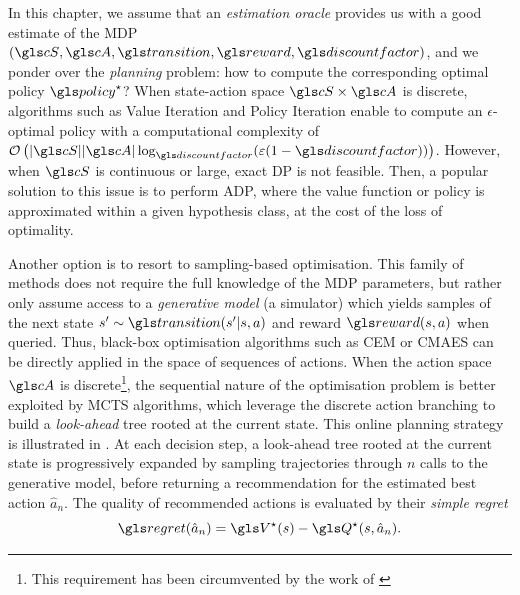 In this chapter, we assume that an \emph{estimation oracle} provides us with a good estimate of the \gls{MDP} $(\cS, \cA, \Ps, \reward, \discount)$, and we ponder over the \emph{planning} problem: how to compute the corresponding optimal policy $\policy^\star$?
When state-action space $\cS\times\cA$ is discrete,  algorithms such as Value Iteration \citep{Bellman1957} and Policy Iteration \citep{Howard1960} enable to compute an $\epsilon$-optimal policy with a computational complexity of $\cO\left(|\cS||\cA|\log_\discount(\epsilon(1-\discount))\right)$. However, when $\cS$ is continuous or large, exact \gls{DP} is not feasible. Then, a popular solution to this issue is to perform \gls{ADP}, where the value function or policy is approximated within a given hypothesis class, at the cost of the loss of optimality.

Another option is to resort to sampling-based optimisation. This family of methods does not require the full knowledge of the \gls{MDP} parameters, but rather only assume access to a \emph{generative model} (\eg a simulator) which yields samples of the next state $s' \sim \Ps\parentheses{s'|s,a}$ and reward $\R(s, a)$ when queried. Thus, black-box optimisation algorithms such as \gls{CEM} or \gls{CMAES} can be directly applied in the space of sequences of actions. When the action space $\cA$ is discrete\footnote{This requirement has been circumvented by the work of \citet{Coulom2007,Chaslot2008,Wang2009,Busoniu2013,Busoniu2018}}, the sequential nature of the optimisation problem is better exploited by \gls{MCTS} algorithms, which leverage the discrete action branching to build a \emph{look-ahead} tree rooted at the current state. This online planning strategy is illustrated in . At each decision step, a look-ahead tree rooted at the current state is progressively expanded by sampling trajectories through $n$ calls to the generative model, before returning a recommendation for the estimated best action $\hat{a}_n$. The quality of recommended actions is evaluated by their \emph{simple regret}
\begin{equation*}
\regret(\hat{a}_n) = \V^\star(s) - \Q^\star(s, \hat{a}_n).
\end{equation*}

